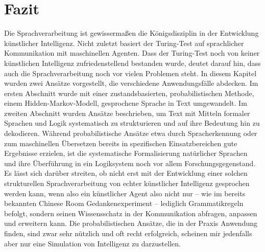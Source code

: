 \section{Fazit}
Die Sprachverarbeitung ist gewissermaßen die Königsdisziplin in der Entwicklung künstlicher Intelligenz.
Nicht zuletzt basiert der Turing-Test auf sprachlicher Kommunikation mit maschinellen Agenten.
Dass der Turing-Test noch von keiner künstlichen Intelligenz zufriedenstellend bestanden wurde, deutet darauf hin, dass auch die Sprachverarbeitung noch vor vielen Problemen steht.
In diesem Kapitel wurden zwei Ansätze vorgestellt, die verschiedene Anwendungsfälle abdecken.
Im ersten Abschnitt wurde mit einer zustandsbasierten, probabilistischen Methode, einem Hidden-Markov-Modell, gesprochene Sprache in Text umgewandelt.
Im zweiten Abschnitt wurden Ansätze beschrieben, um Text mit Mitteln formaler Sprachen und Logik systematisch zu strukturieren und auf ihre Bedeutung hin zu dekodieren.
Während probabilistische Ansätze etwa durch Spracherkennung oder zum maschinellen Übersetzen bereits in spezifischen Einsatzbereichen gute Ergebnisse erzielen, ist die systematische Formalisierung natürlicher Sprachen und ihre Überführung in ein Logiksystem noch vor allem Forschungsgegenstand.
Es lässt sich darüber streiten, ob nicht erst mit der Entwicklung einer solchen strukturellen Sprachverarbeitung von echter künstlicher Intelligenz gesprochen werden kann, wenn also ein künstlicher Agent also nicht nur – wie im bereits bekannten Chinese Room Gedankenexperiment – lediglich Grammatikregeln befolgt, sondern seinen Wissensschatz in der Kommunikation abfragen, anpassen und erweitern kann.
Die probabilistischen Ansätze, die in der Praxis Anwendung finden, sind zwar sehr nützlich und oft recht erfolgreich, scheinen mir jedenfalls aber nur eine Simulation von Intelligenz zu darzustellen.

